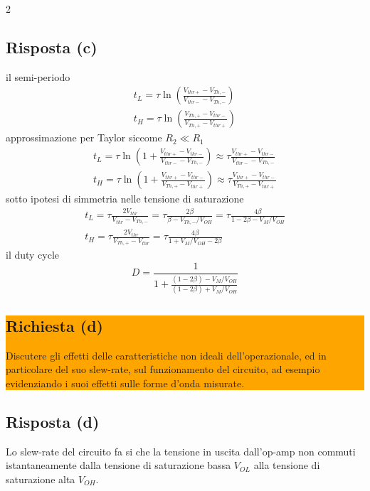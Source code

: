 \begin{multicols}{2}
  \subsection*{Risposta (c)}
  il semi-periodo
  \begin{equation*}
    \begin{gathered}
      t_L = \tau\ln\left(\frac{V_{thr+} - V_{Th,-}}{V_{thr-} - V_{Th,-}}\right) \\
      t_H = \tau\ln\left(\frac{V_{Th,+} - V_{thr-}}{V_{Th,+} - V_{thr+}}\right)
    \end{gathered}
  \end{equation*}
  approssimazione per Taylor siccome $R_2 \ll R_1$
  \begin{equation*}
    \begin{gathered}
      t_L =  \tau\ln\left(1 + \frac{V_{thr+} - V_{thr-}}{V_{thr-} - V_{Th,-}}\right) \approx \tau\frac{V_{thr+} - V_{thr-}}{V_{thr-} - V_{Th,-}} \\
      t_H =  \tau\ln\left(1 + \frac{V_{thr+} - V_{thr-}}{V_{Th,+} - V_{thr+}}\right) \approx \tau\frac{V_{thr+} - V_{thr-}}{V_{Th,+} - V_{thr+}}
    \end{gathered}
  \end{equation*}
  sotto ipotesi di simmetria nelle tensione di saturazione
  \begin{equation*}
    \begin{gathered}
      t_L = \tau\frac{2V_{thr}}{V_{thr} - V_{Th,-}} = \tau\frac{2\beta}{\beta - V_{Th,-}/V_{OH}} = \tau\frac{4\beta}{1 - 2\beta - V_M/V_{OH}} \\
      t_H = \tau\frac{2V_{thr}}{V_{Th,+} - V_{thr}} = \tau\frac{4\beta}{1 + V_M/V_{OH} - 2\beta}
    \end{gathered}
  \end{equation*}
  il duty cycle
  \begin{equation*}
    D = \frac{1}{1 + \frac{(1 - 2\beta) - V_M/V_{OH}}{(1 - 2\beta) + V_M/V_{OH}}}
  \end{equation*}

  \noindent\colorbox{orange}{
    \begin{minipage}{0.9\linewidth}
      \subsection*{Richiesta (d)}
      Discutere gli effetti delle caratteristiche non ideali dell'operazionale, ed in
      particolare del suo slew-rate, sul funzionamento del circuito, ad esempio evidenziando i suoi
      effetti sulle forme d'onda misurate.
    \end{minipage}
  }
  \subsection*{Risposta (d)}
  Lo slew-rate del circuito fa si che la tensione in uscita dall'op-amp non commuti istantaneamente
  dalla tensione di saturazione bassa $V_{OL}$ alla tensione di saturazione alta $V_{OH}$.
\end{multicols}
